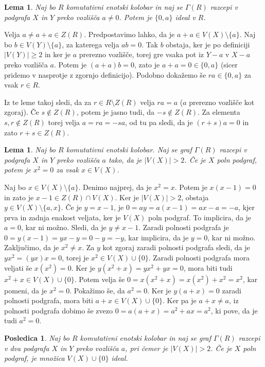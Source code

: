 \documentclass[a4paper, 12pt]{amsart}
\theoremstyle{definition} %
\theoremstyle{plain} %
\newtheorem{lema}[definicija]{Lema}
\newtheorem{posledica}[definicija]{Posledica}
\begin{document}
\begin{lema}
Naj bo $R$ komutativni enotski kolobar in naj se $\Gamma(R)$ razcepi v podgrafa $X$ in $Y$ preko vozlišča $a\neq 0$. Potem je $\{0,a\}$ ideal v $R$.
\end{lema}

\proof
Velja $a \neq a+ a \in Z(R)$. Predpostavimo lahko, da je $a+a \in V(X) \setminus \{a\}$. Naj bo $b\in V(Y) \setminus \{a\}$, za katerega velja $ab = 0$. Tak $b$ obstaja, ker je po definiciji $|V(Y)| \ge 2$ in ker je $a$ prerezno vozlišče, torej gre vsaka pot iz $Y-a$ v $X-a$ preko vozlišča $a$. Potem je $(a+a)b = 0$, zato je $a+a = 0 \in \{0,a\}$ (sicer pridemo v nasprotje z zgornjo definicijo). Podobno dokažemo še $ra \in \{0,a\}$ za vsak $r\in R$.
\endproof

Iz te leme takoj sledi, da za $r\in R\setminus Z(R)$ velja $ra = a$ ($a$ prerezno vozlišče kot zgoraj). Če $s\notin Z(R)$, potem je jasno tudi, da $-s \notin Z(R)$. Za elementa $s,r\notin Z(R)$ torej velja $a=ra=-sa$, od tu pa sledi, da je $(r+s)a = 0$ in zato $r+s \in Z(R)$.

\begin{lema}
Naj bo $R$ komutativni enotski kolobar. Naj se graf $\Gamma(R)$ razcepi v podgrafa $X$ in $Y$ preko vozlišča $a$ tako, da je $|V(X)|>2$. Če je $X$ poln podgraf, potem je $x^2 = 0$ za vsak $x\in V(X)$.
\end{lema}

\proof
Naj bo $x\in V(X)\setminus \{a\}$. Denimo najprej, da je $x^2 = x$. Potem je $x(x-1) = 0$ in zato je $x-1\in Z(R) \cap V(X)$. Ker je $|V(X)|> 2$, obstaja $y\in V(X)\setminus \{a,x\}$. Če je $y = x-1$, je $0 = ay = a(x-1) = ax - a = -a$, kjer prva in zadnja enakost veljata, ker je $V(X)$ poln podgraf. To implicira, da je $a=0$, kar ni možno. Sledi, da je $y\neq x-1$. Zaradi polnosti podgrafa je $0 = y(x-1) = yx-y = 0-y = -y$, kar implicira, da je $y=0$, kar ni možno. Zaključimo, da je $x^2 \neq x$. Za $y$ kot zgoraj zaradi polnosti podgrafa sledi, da je $yx^2 = (yx)x = 0$, torej je $x^2 \in V(X)\cup\{0\}$. Zaradi polnosti podgrafa mora veljati še $x(x^2)=0$. Ker je $y(x^2 + x ) = yx^2 + yx =0 $, mora biti tudi $x^2 + x\in V(X) \cup \{0\}$. Potem velja še  $0 = x(x^2 + x) = x(x^2) + x^2 = x^2$, kar pomeni, da je $x^2 = 0$. Pokažimo še, da $a^2 = 0$. Ker je $y(a+x) = 0 $ zaradi polnosti podgrafa, mora biti $a+x\in V(X) \cup\{0\}$. Ker pa je $a+x \neq a$, iz polnosti podgrafa dobimo še zvezo $0 = a(a+x) = a^2 + ax = a^2$, ki pove, da je tudi $a^2 = 0$.
\endproof

\begin{posledica}
Naj bo $R$ komutativni enotski kolobar in naj se graf $\Gamma(R)$ razcepi v dva podgrafa $X$ in $Y$ preko vozlišča $a$, pri čemer je $|V(X)|>2$. Če je $X$ poln podgraf, je množica $V(X)\cup \{0\}$ ideal.
\end{posledica}
\end{document}
